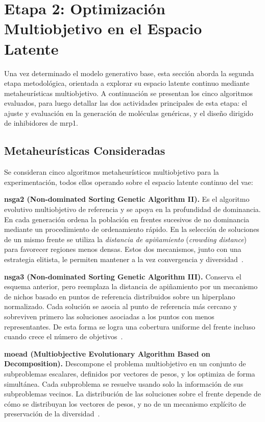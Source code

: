 \section{Etapa 2: Optimización Multiobjetivo en el Espacio Latente}
\label{sec:etapa2_optimizacion}
\label{sec:optimizacion_multiobjetivo}

Una vez determinado el modelo generativo base, esta sección aborda la segunda etapa metodológica, orientada a explorar su espacio latente continuo mediante metaheurísticas multiobjetivo. A continuación se presentan los cinco algoritmos evaluados, para luego detallar las dos actividades principales de esta etapa: el ajuste y evaluación en la generación de moléculas genéricas, y el diseño dirigido de inhibidores de \gls{mrp1}.

\subsection{Metaheurísticas Consideradas}
\label{subsec:metaheuristicas}
\label{subsubsec:metaheuristicas}
\label{sec:metaheuristicas}

Se consideran cinco algoritmos metaheurísticos multiobjetivo para la experimentación, todos ellos operando sobre el espacio latente continuo del \gls{vae}:

\textbf{\acrshort{nsga2} (Non-dominated Sorting Genetic Algorithm II).} Es el algoritmo evolutivo multiobjetivo de referencia y se apoya en la profundidad de dominancia. En cada generación ordena la población en frentes sucesivos de no dominancia mediante un procedimiento de ordenamiento rápido. En la selección de soluciones de un mismo frente se utiliza la \textit{distancia de apiñamiento} (\textit{crowding distance}) para favorecer regiones menos densas. Estos dos mecanismos, junto con una estrategia elitista, le permiten mantener a la vez convergencia y diversidad~\cite{deb2002nsga2}.

\textbf{\acrshort{nsga3} (Non-dominated Sorting Genetic Algorithm III).} Conserva el esquema anterior, pero reemplaza la distancia de apiñamiento por un mecanismo de nichos basado en puntos de referencia distribuidos sobre un hiperplano normalizado. Cada solución se asocia al punto de referencia más cercano y sobreviven primero las soluciones asociadas a los puntos con menos representantes. De esta forma se logra una cobertura uniforme del frente incluso cuando crece el número de objetivos~\cite{deb2014nsga3}.

\textbf{\acrshort{moead} (Multiobjective Evolutionary Algorithm Based on Decomposition).} Descompone el problema multiobjetivo en un conjunto de subproblemas escalares, definidos por vectores de pesos, y los optimiza de forma simultánea. Cada subproblema se resuelve usando solo la información de sus subproblemas vecinos. La distribución de las soluciones sobre el frente depende de cómo se distribuyan los vectores de pesos, y no de un mecanismo explícito de preservación de la diversidad~\cite{zhang2007moead}.

